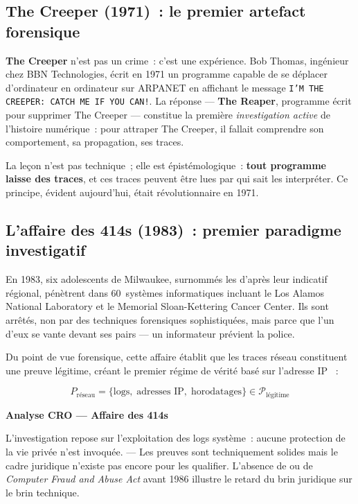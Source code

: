 \subsection{The Creeper (1971)~: le premier artefact forensique}

\textbf{The Creeper} n'est pas un crime~: c'est une expérience. Bob Thomas,
ingénieur chez BBN Technologies, écrit en 1971 un programme capable de
se déplacer d'ordinateur en ordinateur sur ARPANET en affichant le message
\texttt{I'M THE CREEPER: CATCH ME IF YOU CAN!}. La réponse --- \textbf{The
Reaper}, programme écrit pour supprimer The Creeper --- constitue la
première \emph{investigation active} de l'histoire numérique~: pour
attraper The Creeper, il fallait comprendre son comportement, sa propagation,
ses traces.

\medskip

La leçon n'est pas technique~; elle est épistémologique~: \textbf{tout
programme laisse des traces}, et ces traces peuvent être lues par qui sait
les interpréter. Ce principe, évident aujourd'hui, était révolutionnaire
en 1971.

\subsection{L'affaire des 414s (1983)~: premier paradigme investigatif}

En 1983, six adolescents de Milwaukee, surnommés les  d'après
leur indicatif régional, pénètrent dans 60~systèmes informatiques incluant le
Los Alamos National Laboratory et le Memorial Sloan-Kettering Cancer Center.
Ils sont arrêtés, non par des techniques forensiques sophistiquées, mais parce
que l'un d'eux se vante devant ses pairs --- un informateur prévient la police.

\medskip

Du point de vue forensique, cette affaire établit que les traces réseau
constituent une preuve légitime, créant le premier régime de vérité basé
sur l'adresse IP \cite{chap2pdf}~:

\begin{equation}
P_{\text{réseau}} = \bigl\{\text{logs},\; \text{adresses IP},\;
\text{horodatages}\bigr\} \in \mathcal{P}_{\text{légitime}}
\label{eq:preuve-reseau}
\end{equation}

\begin{boxCRO}
\textbf{Analyse CRO --- Affaire des 414s}

L'investigation repose sur l'exploitation des logs système~: aucune protection
de la vie privée n'est invoquée. \cro{$\downarrow$}{$\uparrow$}{$\downarrow$} ---
Les preuves sont techniquement solides mais le cadre juridique n'existe pas encore
pour les qualifier. L'absence de \loicam{} ou de \textit{Computer Fraud and Abuse
Act} avant 1986 illustre le retard du brin juridique sur le brin technique.
\end{boxCRO}

